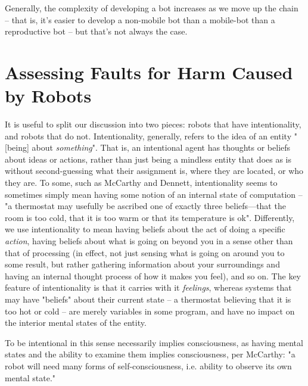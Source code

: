 \documentclass[12]{article}
\begin{document}
	Generally, the complexity of developing a bot increases as we move up the chain -- that is, it's easier to develop a non-mobile bot than a mobile-bot than a reproductive bot -- but that's not always the case.	
	
\section{Assessing Faults for Harm Caused by Robots}
	It is useful to split our discussion into two pieces: robots that have intentionality, and robots that do not. Intentionality, generally, refers to the idea of an entity "[being] about \textit{something}"\cite{intentionality}. That is, an intentional agent has thoughts or beliefs about ideas or actions, rather than just being a mindless entity that does as is without second-guessing what their assignment is, where they are located, or who they are. To some, such as McCarthy and Dennett\cite{mccarthy,dennet}, intentionality seems to sometimes simply mean having some notion of an internal state of computation -- "a thermostat may usefully be ascribed one of exactly three beliefs—that the room is too cold, that it is too warm or that its temperature is ok"\cite{mccarthy}. Differently, we use intentionality to mean having beliefs about the act of doing a specific \textit{action}, having beliefs about what is going on beyond you in a sense other than that of processing (in effect, not just sensing what is going on around you to some result, but rather gathering information about your surroundings and having an internal thought process of how it makes you feel), and so on. The key feature of intentionality is that it carries with it \textit{feelings}, whereas systems that may have "beliefs" about their current state -- a thermostat believing that it is too hot or cold -- are merely variables in some program, and have no impact on the interior mental states of the entity. 
	
	 To be intentional in this sense necessarily implies consciousness, as having mental states and the ability to examine them implies consciousness, per McCarthy: "a robot will need many forms of self-consciousness, i.e. ability to observe its own mental state."\cite{mccarthy}  
\end{document}
